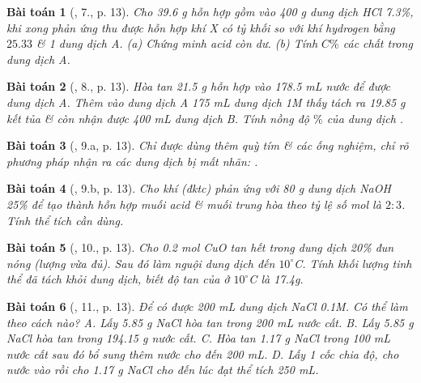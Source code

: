 \documentclass{article}
\newtheorem{baitoan}{Bài toán}
\begin{document}
\begin{baitoan}[\cite{An_400_BT_Hoa_Hoc_9}, 7., p. 13]
	Cho {\rm39.6 g} hỗn hợp gồm {\rm{}} vào {\rm400 g} dung dịch {\rm HCl 7.3\%}, khi xong phản ứng thu được hỗn hợp khí X có tỷ khối so với khí hydrogen bằng $25.33$ \& 1 dung dịch A. (a) Chứng minh acid còn dư. (b) Tính $C\%$ các chất trong dung dịch A.
\end{baitoan}

\begin{baitoan}[\cite{An_400_BT_Hoa_Hoc_9}, 8., p. 13]
	Hòa tan {\rm21.5 g} hỗn hợp {\rm{}} vào {\rm178.5 mL} nước để được dung dịch A. Thêm vào dung dịch A {\rm175 mL} dung dịch {\rm{} 1M} thấy tách ra {\rm19.85 g} kết tủa \& còn nhận được {\rm400 mL} dung dịch B. Tính nồng độ $\%$ của dung dịch {\rm{}}.
\end{baitoan}

\begin{baitoan}[\cite{An_400_BT_Hoa_Hoc_9}, 9.a, p. 13]
	Chỉ được dùng thêm quỳ tím \& các ống nghiệm, chỉ rõ phương pháp nhận ra các dung dịch bị mất nhãn: {\rm{}}.
\end{baitoan}

\begin{baitoan}[\cite{An_400_BT_Hoa_Hoc_9}, 9.b, p. 13]
	Cho khí {\rm{}} (đktc) phản ứng với {\rm80 g} dung dịch {\rm NaOH 25\%} để tạo thành hỗn hợp muối acid \& muối trung hòa theo tỷ lệ số mol là $2:3$. Tính thể tích {\rm{}} cần dùng.
\end{baitoan}

\begin{baitoan}[\cite{An_400_BT_Hoa_Hoc_9}, 10., p. 13]
	Cho {\rm0.2 mol CuO} tan hết trong dung dịch {\rm{} 20\%} đun nóng (lượng vừa đủ). Sau đó làm nguội dung dịch đến $10^\circ${\rm C}. Tính khối lượng tinh thể {\rm{}} đã tách khỏi dung dịch, biết độ tan của {\rm{}} ở $10^\circ${\rm C} là {\rm17.4g}.
\end{baitoan}

\begin{baitoan}[\cite{An_400_BT_Hoa_Hoc_9}, 11., p. 13]
	Để có được {\rm200 mL} dung dịch {\rm NaCl 0.1M}. Có thể làm theo cách nào? {\sf A.} Lấy {\rm5.85 g NaCl} hòa tan trong {\rm200 mL} nước cất. {\sf B.} Lấy {\rm5.85 g NaCl} hòa tan trong {\rm194.15 g} nước cất. {\sf C.} Hòa tan {\rm1.17 g NaCl} trong {\rm100 mL} nước cất sau đó bổ sung thêm nước cho đến {\rm200 mL}. {\sf D.} Lấy 1 cốc chia độ, cho nước vào rồi cho {\rm1.17 g NaCl} cho đến lúc đạt thể tích {\rm250 mL}.
\end{baitoan}
\end{document}
